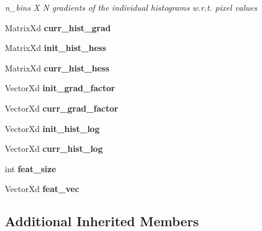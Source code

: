 \begin{DoxyCompactItemize}
\begin{DoxyCompactList}\small\item\em n\-\_\-bins X N gradients of the individual histograms w.\-r.\-t. pixel values \end{DoxyCompactList}\item 
\hypertarget{classKLD_a91532b248ec97d51fba9e12da77da587}{Matrix\-Xd {\bfseries curr\-\_\-hist\-\_\-grad}}\label{classKLD_a91532b248ec97d51fba9e12da77da587}

\item 
\hypertarget{classKLD_a39902f8002bfde64ce618ce63dcb87d9}{Matrix\-Xd {\bfseries init\-\_\-hist\-\_\-hess}}\label{classKLD_a39902f8002bfde64ce618ce63dcb87d9}

\item 
\hypertarget{classKLD_ab2bfa3d2f5b20ed0e61ac66322b9f7fc}{Matrix\-Xd {\bfseries curr\-\_\-hist\-\_\-hess}}\label{classKLD_ab2bfa3d2f5b20ed0e61ac66322b9f7fc}

\item 
\hypertarget{classKLD_a4635f1ff5cb739cb687ca4ebd404dc6c}{Vector\-Xd {\bfseries init\-\_\-grad\-\_\-factor}}\label{classKLD_a4635f1ff5cb739cb687ca4ebd404dc6c}

\item 
\hypertarget{classKLD_ae464ff1e1bc97020b1c48f68d6572ac8}{Vector\-Xd {\bfseries curr\-\_\-grad\-\_\-factor}}\label{classKLD_ae464ff1e1bc97020b1c48f68d6572ac8}

\item 
\hypertarget{classKLD_ae5f76cdc448fd689b6a3b8203a9c5513}{Vector\-Xd {\bfseries init\-\_\-hist\-\_\-log}}\label{classKLD_ae5f76cdc448fd689b6a3b8203a9c5513}

\item 
\hypertarget{classKLD_a3e641a379b707e0bd10f7b76a5bd1ae6}{Vector\-Xd {\bfseries curr\-\_\-hist\-\_\-log}}\label{classKLD_a3e641a379b707e0bd10f7b76a5bd1ae6}

\item 
\hypertarget{classKLD_a2f64e376047799b0bc7838b3ef895278}{int {\bfseries feat\-\_\-size}}\label{classKLD_a2f64e376047799b0bc7838b3ef895278}

\item 
\hypertarget{classKLD_a58387f23acf88b35444a69399e8723fd}{Vector\-Xd {\bfseries feat\-\_\-vec}}\label{classKLD_a58387f23acf88b35444a69399e8723fd}

\end{DoxyCompactItemize}
\subsection*{Additional Inherited Members}


